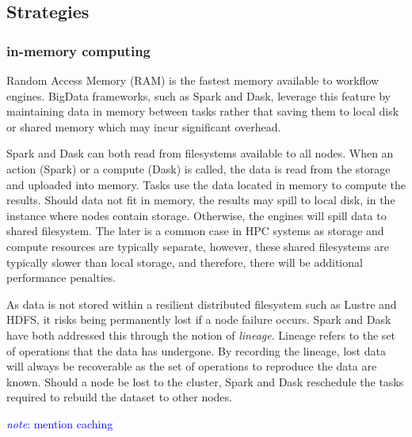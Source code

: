 \documentclass{report}
\newcommand{\note}[1]{\textcolor{blue}{\textit{note}: #1}}
\begin{document}
            \subsection{Strategies}
                \subsubsection{in-memory computing}
                    Random Access Memory (RAM) is the fastest memory available
                    to workflow engines. BigData frameworks, such as Spark and 
                    Dask, leverage this feature by maintaining data in memory 
                    between tasks rather that saving them to local disk or 
                    shared memory which may incur significant overhead.

                    Spark and Dask can both read from filesystems available to
                    all nodes. When an action (Spark) or a compute (Dask) is 
                    called, the data is read from the storage and uploaded into
                    memory. Tasks use the data located in memory to compute the
                    results. Should data not fit in memory, the results may 
                    spill to local disk, in the instance where nodes contain
                    storage. Otherwise, the engines will spill data to shared 
                    filesystem. The later is a common case in HPC systems as 
                    storage and compute resources are typically separate, 
                    however, these shared filesystems are typically slower than 
                    local storage, and therefore, there will be additional 
                    performance penalties.

                    As data is not stored within a resilient distributed 
                    filesystem such as Lustre and HDFS, it risks being 
                    permanently lost if a node failure occurs. Spark and Dask
                    have both addressed this through the notion of 
                    \textit{lineage}. Lineage refers to the set of operations
                    that the data has undergone. By recording the lineage, lost
                    data will always be recoverable as the set of operations
                    to reproduce the data are known. Should a node be lost to 
                    the cluster, Spark and Dask reschedule the tasks required 
                    to rebuild the dataset to other nodes.

                    \note{mention caching}
\end{document}
